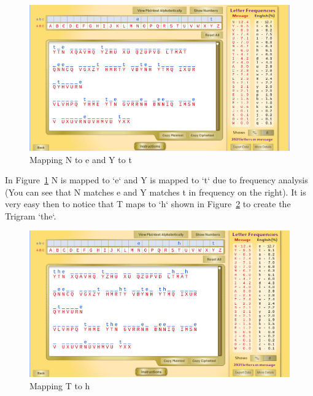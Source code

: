\documentclass[12pt]{article}
\begin{document}
\begin{figure}[H]
    \begin{center}
        \includegraphics[scale=0.48]{c4.png}
    \end{center}{}
    \caption{Mapping N to e and Y to t}
    \label{fig:c4}
\end{figure}

In Figure~\ref{fig:c4} N is mapped to `e` and Y is mapped to `t` due to frequency analysis (You can see that N matches e and Y matches t in frequency on the right). It is very easy then to notice that T maps to `h` shown in Figure~\ref{fig:c5} to create the Trigram `the`.

\begin{figure}[H]
    \begin{center}
        \includegraphics[scale=0.48]{c5.png}
    \end{center}{}
    \caption{Mapping T to h}
    \label{fig:c5}
\end{figure}
\end{document}
